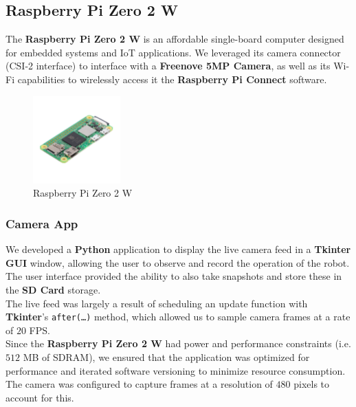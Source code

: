 \documentclass{article}
\begin{document}
\subsection{Raspberry Pi Zero 2 W}

The \textbf{Raspberry Pi Zero 2 W} is an affordable single-board computer designed for
embedded systems and IoT applications. We leveraged its camera connector (CSI-2 interface)
to interface with a \textbf{Freenove 5MP Camera}, as well as its Wi-Fi capabilities to
wirelessly access it the \textbf{Raspberry Pi Connect} software.

\begin{figure}[H]
    \centering
    \includegraphics[width=0.3\textwidth]{Figures/PiZero_2.jpg}
    \caption{Raspberry Pi Zero 2 W}
    \label{fig:raspberrypi}
\end{figure}

\subsubsection{Camera App}

\begin{minipage}{\linewidth}
    We developed a \textbf{Python} application to display the live camera feed in a \textbf{Tkinter GUI} window,
    allowing the user to observe and record the operation of the robot. The user interface provided the ability to also
    take snapshots and store these in the \textbf{SD Card} storage. \\

    The live feed was largely a result of scheduling an update function with \textbf{Tkinter}'s \texttt{after(\dots)} method,
    which allowed us to sample camera frames at a rate of $20$ FPS. \\

    Since the \textbf{Raspberry Pi Zero 2 W} had power and performance constraints (i.e. $512$ MB of SDRAM),
    we ensured that the application was optimized for performance and iterated software versioning
    to minimize resource consumption. The camera was configured to capture frames at a resolution of $480$ pixels to account for this. \\
\end{minipage}
\end{document}
